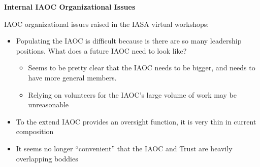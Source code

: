 \documentclass[helvetica]{seminar}
\newcommand{\heading}[1]{%
  \begin{center} 
    \large\bf 
    #1 
  \end{center} 
  \vspace{.4 in}}
\begin{document}
\begin{slide}
\heading{Internal IAOC Organizational Issues}

IAOC organizational issues raised in the IASA virtual workshops:
\begin{itemize}
\item Populating the IAOC is difficult because is there are so many
  leadership positions. What does a future IAOC need to look like?
  \begin{itemize}
  \item Seems to be pretty clear that the IAOC needs to be bigger, and
    needs to have more general members.
  \item Relying on volunteers for the IAOC's large volume of work may
    be unreasonable
  \end{itemize}
\item To the extend IAOC provides an oversight function, it is very
  thin in current composition
\item It seems no longer ``convenient'' that the IAOC and Trust are
  heavily overlapping boddies
\end{itemize}

\end{slide}
\end{document}
